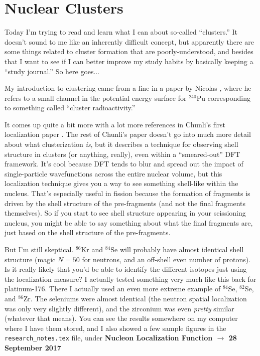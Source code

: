 \chapter{Nuclear Clusters}

Today I'm trying to read and learn what I can about so-called ``clusters.'' It doesn't sound to me like an inherently difficult concept, but apparently there are some things related to cluster formation that are poorly-understood, and besides that I want to see if I can better improve my study habits by basically keeping a ``study journal.'' So here goes...

My introduction to clustering came from a line in a paper by Nicolas \cite{Schunck2014PES}, where he refers to a small channel in the potential energy surface for $^{240}$Pu corresponding to something called ``cluster radioactivity.''

It comes up quite a bit more with a lot more references in Chunli's first localization paper \cite{Zhang2016localization}. The rest of Chunli's paper doesn't go into much more detail about what clusterization \textit{is}, but it describes a technique for observing shell structure in clusters (or anything, really), even within a ``smeared-out'' DFT framework. It's cool because DFT tends to blur and spread out the impact of single-particle wavefunctions across the entire nuclear volume, but this localization technique gives you a way to see something shell-like within the nucleus. That's especially useful in fission because the formation of fragments is driven by the shell structure of the pre-fragments (and not the final fragments themselves). So if you start to see shell structure appearing in your scissioning nucleus, you might be able to say something about what the final fragments are, just based on the shell structure of the pre-fragments.

But I'm still skeptical. $^{86}$Kr and $^{84}$Se will probably have almost identical shell structure (magic $N=50$ for neutrons, and an off-shell even number of protons). Is it really likely that you'd be able to identify the different isotopes just using the localization measure? I actually tested something very much like this back for platinum-176. There I actually used an even more extreme example of $^{84}$Se, $^{82}$Se, and $^{86}$Zr. The seleniums were almost identical (the neutron spatial localization was only very slightly different), and the zirconium was even \textit{pretty} similar (whatever that means). You can see the results somewhere on my computer where I have them stored, and I also showed a few sample figures in the \texttt{research\_notes.tex} file, under \textbf{Nucleon Localization Function $\rightarrow$ 28 September 2017}

